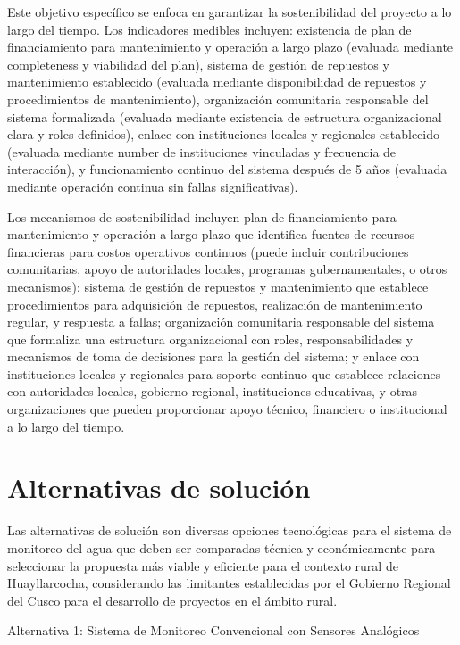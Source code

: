 Este objetivo específico se enfoca en garantizar la sostenibilidad del proyecto a lo largo del tiempo. Los indicadores medibles incluyen: existencia de plan de financiamiento para mantenimiento y operación a largo plazo (evaluada mediante completeness y viabilidad del plan), sistema de gestión de repuestos y mantenimiento establecido (evaluada mediante disponibilidad de repuestos y procedimientos de mantenimiento), organización comunitaria responsable del sistema formalizada (evaluada mediante existencia de estructura organizacional clara y roles definidos), enlace con instituciones locales y regionales establecido (evaluada mediante number de instituciones vinculadas y frecuencia de interacción), y funcionamiento continuo del sistema después de 5 años (evaluada mediante operación continua sin fallas significativas).

Los mecanismos de sostenibilidad incluyen plan de financiamiento para mantenimiento y operación a largo plazo que identifica fuentes de recursos financieras para costos operativos continuos (puede incluir contribuciones comunitarias, apoyo de autoridades locales, programas gubernamentales, o otros mecanismos); sistema de gestión de repuestos y mantenimiento que establece procedimientos para adquisición de repuestos, realización de mantenimiento regular, y respuesta a fallas; organización comunitaria responsable del sistema que formaliza una estructura organizacional con roles, responsabilidades y mecanismos de toma de decisiones para la gestión del sistema; y enlace con instituciones locales y regionales para soporte continuo que establece relaciones con autoridades locales, gobierno regional, instituciones educativas, y otras organizaciones que pueden proporcionar apoyo técnico, financiero o institucional a lo largo del tiempo.


\section{Alternativas de solución}

Las alternativas de solución son diversas opciones tecnológicas para el sistema de monitoreo del agua que deben ser comparadas técnica y económicamente para seleccionar la propuesta más viable y eficiente para el contexto rural de Huayllarcocha, considerando las limitantes establecidas por el Gobierno Regional del Cusco para el desarrollo de proyectos en el ámbito rural.

Alternativa 1: Sistema de Monitoreo Convencional con Sensores Analógicos

